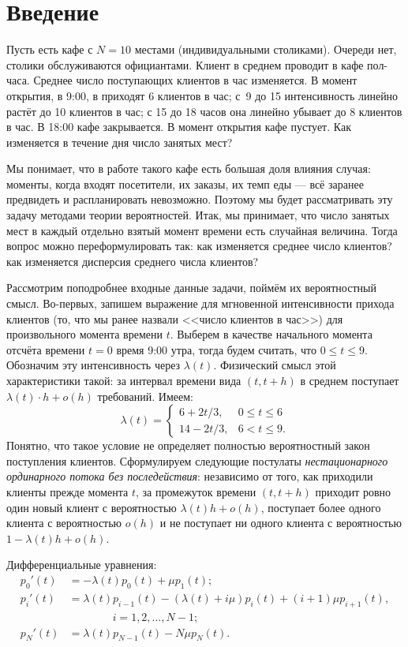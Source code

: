 \documentclass[10pt,oneside,final]{book}
\renewcommand{\leq}{\leqslant}
\begin{document}
\newpage
\chapter{Введение}

Пусть есть кафе с $N=10$ местами (индивидуальными столиками). Очереди нет,
столики обслуживаются официантами. Клиент в среднем
проводит в кафе пол-часа. Среднее число поступающих клиентов в час изменяется. В
момент открытия, в 9:00, в приходят 6 клиентов в час; с~9 до 15 интенсивность
линейно растёт до 10 клиентов в час; с 15 до 18 часов она линейно убывает до 8
клиентов в час. В 18:00 кафе закрывается. В момент открытия кафе пустует. Как
изменяется в течение дня число занятых мест?

Мы понимает, что в работе такого кафе есть большая доля влияния случая: моменты,
когда входят посетители, их заказы, их темп еды --- всё заранее предвидеть и
распланировать невозможно. Поэтому мы будет рассматривать эту задачу методами
теории вероятностей. Итак, мы принимает, что число занятых мест в каждый
отдельно взятый момент времени есть случайная величина. Тогда вопрос можно
переформулировать так: как изменяется среднее число клиентов? как изменяется
дисперсия среднего числа клиентов?

Рассмотрим поподробнее входные данные задачи, поймём их вероятностный
смысл. Во-первых, запишем выражение для мгновенной интенсивности прихода
клиентов (то, что мы ранее назвали <<число клиентов в час>>) для произвольного
момента времени $t$. Выберем в качестве начального момента отсчёта времени $t=0$
время 9:00 утра, тогда будем считать, что $0\leq t\leq 9$. Обозначим эту
интенсивность через $\lambda(t)$. Физический смысл этой характеристики такой: за
интервал времени вида $(t, t+h)$ в среднем поступает $\lambda(t)\cdot h+o(h)$
требований.  Имеем:
\[
\lambda(t)=\begin{cases}
  6+2t/3,& 0\leq t\leq 6\\
  14-2t/3,& 6< t \leq 9.
\end{cases}
\]
Понятно, что такое
условие не определяет полностью вероятностный закон поступления
клиентов. Сформулируем следующие постулаты \emph{нестационарного ординарного
  потока без последействия}: независимо от того, как приходили клиенты прежде
момента $t$, за промежуток времени $(t, t+h)$ приходит ровно один новый клиент с
вероятностью $\lambda(t)h+o(h)$, поступает более одного клиента с
вероятностью $o(h)$ и не поступает ни одного клиента с вероятностью
$1-\lambda(t)h+o(h)$. 

Дифференциальные уравнения: 
\begin{align*}
  p_0'(t) & = -\lambda(t)p_0(t)+\mu p_1(t);\\
  p_i'(t) & = \lambda(t)p_{i-1}(t)-(\lambda(t)+i\mu)p_i(t)+(i+1)\mu
  p_{i+1}(t),\\ & \qquad \qquad i=1, 2, \ldots, N-1;\\
  p_N'(t) & = \lambda(t)p_{N-1}(t)-N\mu p_N(t).
\end{align*}
\end{document}
